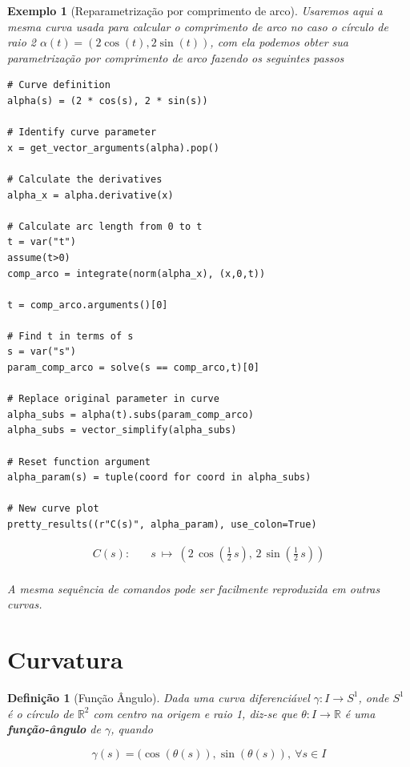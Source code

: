 \documentclass[12pt]{article}
\newtheorem{ex}{Exemplo}[section]
\newtheorem{definition}{Definição}
\begin{document}
\begin{ex}[Reparametrização por comprimento de arco]
Usaremos aqui a mesma curva usada para calcular o comprimento de arco no caso o círculo de raio 2 $\alpha(t) = (2 \cos(t), 2 \sin(t))$, com ela podemos obter sua parametrização por comprimento de arco fazendo os seguintes passos

\begin{lstlisting}
# Curve definition
alpha(s) = (2 * cos(s), 2 * sin(s))

# Identify curve parameter
x = get_vector_arguments(alpha).pop()

# Calculate the derivatives
alpha_x = alpha.derivative(x)
    
# Calculate arc length from 0 to t
t = var("t")
assume(t>0)
comp_arco = integrate(norm(alpha_x), (x,0,t))

t = comp_arco.arguments()[0]
    
# Find t in terms of s
s = var("s")
param_comp_arco = solve(s == comp_arco,t)[0]
    
# Replace original parameter in curve 
alpha_subs = alpha(t).subs(param_comp_arco)
alpha_subs = vector_simplify(alpha_subs)
    
# Reset function argument
alpha_param(s) = tuple(coord for coord in alpha_subs)

# New curve plot
pretty_results((r"C(s)", alpha_param), use_colon=True)
\end{lstlisting}

\newcommand{\Bold}[1]{\mathbf{#1}}\begin{align*} C(s) :& \quad s \ {\mapsto}\ \left(2 \, \cos\left(\frac{1}{2} \, s\right),\,2 \, \sin\left(\frac{1}{2} \, s\right)\right) \\ \end{align*}

A mesma sequência de comandos pode ser facilmente reproduzida em outras curvas. 
\end{ex}

\section{Curvatura}\label{s4}

\begin{definition}[Função Ângulo]
Dada uma curva diferenciável $\gamma: I \rightarrow S^1$, onde $S^1$ é o círculo de $\mathbb{R}^2$ com centro na origem e raio 1, diz-se que $\theta: I \rightarrow \mathbb{R}$ é uma \textbf{função-ângulo} de $\gamma$, quando

$$\gamma(s) = (\cos(\theta(s)), \sin(\theta(s)),\ \forall s \in I$$
\end{definition}
\end{document}
